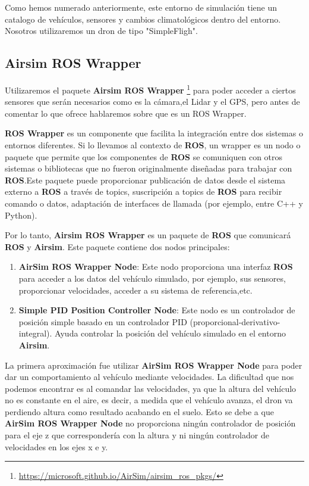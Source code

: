 Como hemos numerado anteriormente, este entorno de simulación tiene un catalogo de vehículos, sensores y
cambios climatológicos dentro del entorno. Nosotros utilizaremos un dron de tipo "SimpleFligh". 

\subsection{Airsim ROS Wrapper}
\label{sec:wrapper}
Utilizaremos el paquete \textbf{Airsim ROS Wrapper} \footnote{\url{https://microsoft.github.io/AirSim/airsim_ros_pkgs/}} para poder acceder a ciertos sensores 
que serán necesarios como es la cámara,el Lidar y el GPS, pero antes de comentar lo que ofrece hablaremos sobre que es un ROS Wrapper. \newline

\textbf{ROS Wrapper} es un componente que facilita la integración entre dos sistemas o entornos diferentes. Si lo llevamos al contexto de \textbf{ROS}, un wrapper es un nodo o paquete 
que permite que los componentes de \textbf{ROS} se comuniquen con otros sistemas o bibliotecas que no fueron originalmente diseñadas para trabajar con \textbf{ROS}.Este paquete 
puede proporcionar publicación de datos desde el sistema externo a \textbf{ROS} a través de topics, suscripción a topics de \textbf{ROS} para recibir comando o datos, adaptación 
de interfaces de llamada (por ejemplo, entre C++ y Python). \newline

Por lo tanto, \textbf{Airsim ROS Wrapper} es un paquete de \textbf{ROS} que comunicará \textbf{ROS} y \textbf{Airsim}. Este paquete contiene dos nodos principales:
\newpage
\begin{enumerate}
  \item \textbf{AirSim ROS Wrapper Node}: Este nodo proporciona una interfaz \textbf{ROS} para acceder a los datos del vehículo simulado, por ejemplo, sus sensores, proporcionar velocidades, acceder a su sistema de referencia,etc. 
  \item \textbf{Simple PID Position Controller Node}: Este nodo es un controlador de posición simple basado en un controlador PID (proporcional-derivativo-integral). Ayuda controlar la posición del vehículo 
  simulado en el entorno \textbf{Airsim}.
\end{enumerate}

La primera aproximación fue utilizar \textbf{AirSim ROS Wrapper Node} para poder dar un comportamiento al vehículo mediante velocidades. 
La dificultad que nos podemos encontrar es al comandar las velocidades, ya que la altura del vehículo no es constante en el aire, es decir, 
a medida que el vehículo avanza, el dron va perdiendo altura como resultado acabando en el suelo. Esto se debe a que \textbf{AirSim ROS Wrapper Node} 
no proporciona ningún controlador de posición para el eje z que correspondería con la altura y ni ningún controlador de velocidades en los ejes x e y.

